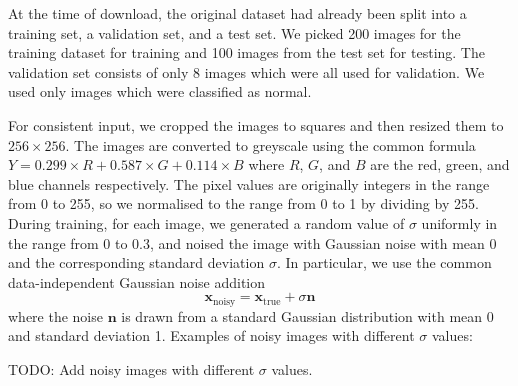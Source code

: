 \documentclass[12pt]{article}
\begin{document}
At the time of download, the original dataset had already been split into a training set, a validation set, and a test set.
We picked 200 images for the training dataset for training and 100 images from the test set for testing. The validation set consists of only 8 images which were all used for validation.
We used only images which were classified as normal.

For consistent input, we cropped the images to squares and then resized them to $256 \times 256$.
The images are converted to greyscale using the common formula $Y = 0.299 \times R + 0.587 \times G + 0.114 \times B$ where $R$, $G$, and $B$ are the red, green, and blue channels respectively.
The pixel values are originally integers in the range from 0 to 255, so we normalised to the range from 0 to 1 by dividing by 255.
During training, for each image, we generated a random value of $\sigma$ uniformly in the range from 0 to 0.3, and noised the image with Gaussian noise with mean 0 and the corresponding standard deviation $\sigma$.
In particular, we use the common data-independent Gaussian noise addition
\begin{equation}
    \mathbf{x}_{\text{noisy}} = \mathbf{x}_{\text{true}} + \sigma \mathbf{n}
\end{equation}
where the noise $\mathbf{n}$ is drawn from a standard Gaussian distribution with mean 0 and standard deviation 1.
Examples of noisy images with different $\sigma$ values:

TODO: Add noisy images with different $\sigma$ values.



\end{document}
